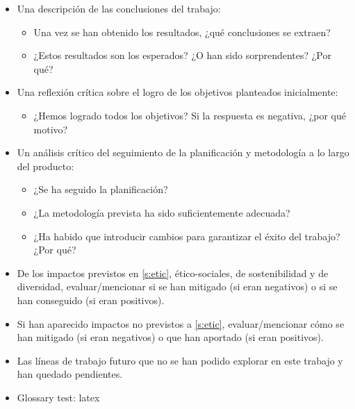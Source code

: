\documentclass[ENG, BIB]{TFUOC}%
\begin{document}
\begin{itemize}
\item Una descripción de las conclusiones del trabajo:
\begin{itemize}
    \item Una vez se han obtenido los resultados, ¿qué conclusiones se extraen?
    \item ¿Estos resultados son los esperados? ¿O han sido sorprendentes? ¿Por qué? 
\end{itemize}
\item Una reflexión crítica sobre el logro de los objetivos planteados inicialmente:
\begin{itemize}
    \item ¿Hemos logrado todos los objetivos? Si la respuesta es negativa, ¿por qué motivo?
\end{itemize}
\item Un análisis crítico del seguimiento de la planificación y metodología a lo largo del producto:
\begin{itemize}
    \item ¿Se ha seguido la planificación?
    \item ¿La metodología prevista ha sido suficientemente adecuada?
    \item ¿Ha habido que introducir cambios para garantizar el éxito del trabajo? ¿Por qué? 
\end{itemize}
\item De los impactos previstos en \ref{s:etic}, ético-sociales, de sostenibilidad y de diversidad, evaluar/mencionar si se han mitigado (si eran negativos) o si se han conseguido (si eran positivos). 
\item Si han aparecido impactos no previstos a \ref{s:etic}, evaluar/mencionar cómo se han mitigado (si eran negativos) o que han aportado (si eran positivos).
\item Las líneas de trabajo futuro que no se han podido explorar en este trabajo y han quedado pendientes.
\item Glossary test:  \gls{latex}


\end{itemize}
\end{document}
